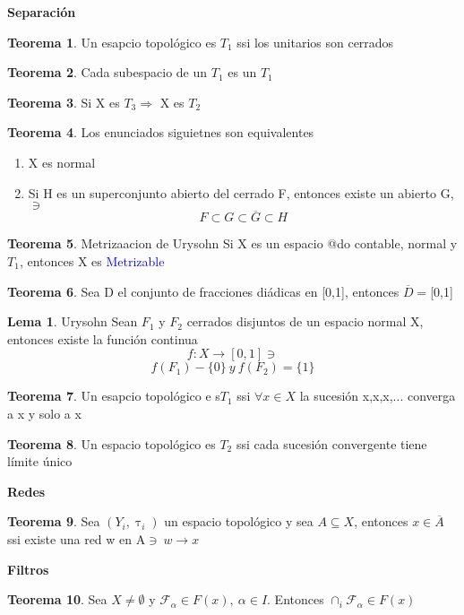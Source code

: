 \documentclass{article}
\theoremstyle{definition}
\newtheorem{theorem}{Teorema}[section]
\newtheorem{lemma}{Lema}[section]
\begin{document}
\textbf{Separación}
\begin{theorem}
	Un esapcio topológico es $T_1$ ssi los unitarios son cerrados
\end{theorem}
\begin{theorem}
	Cada subespacio de un $T_1$ es un $T_1$
\end{theorem}
\begin{theorem}
	Si X es $T_3\Rightarrow$ X es $T_2$
\end{theorem}
\begin{theorem}
	Los enunciados siguietnes son equivalentes
	\begin{enumerate}
		\item X es normal
		\item Si H es un superconjunto abierto del cerrado F, entonces existe un abierto G, $\ni$
		\[F\subset G\subset \overline{G}\subset H\]
	\end{enumerate}
\end{theorem}
\begin{theorem}{Metrizaacion de Urysohn}
	Si X es un espacio @do contable, normal y $T_1$, entonces X es \textcolor{blue}{Metrizable}
\end{theorem}
\begin{theorem}
	Sea D el conjunto de fracciones diádicas en [0,1], entonces $\overline{D}=$[0,1]
\end{theorem}
\begin{lemma}{Urysohn}
	Sean $F_1$ y $F_2$ cerrados disjuntos de un espacio normal X, entonces existe la función continua 
	\[f:X\to[0,1]\ni\]
	\[f(F_1)-\{0\}\ y \ f(F_2)=\{1\}\]
\end{lemma}
\begin{theorem}
	Un esapcio topológico e s$T_1$ ssi $\forall x\in X$ la sucesión x,x,x,... converga a x y solo a x
\end{theorem}
\begin{theorem}
	Un espacio topológico es $T_2$ ssi cada sucesión convergente tiene límite único
\end{theorem}
\textbf{Redes}
\begin{theorem}
	Sea $(Y_i,\uptau_i)$ un espacio topológico y sea $A\subseteq X$, entonces $x\in \overline{A}$ ssi existe una red w en A$\ni\ w\to x$
\end{theorem}
\textbf{Filtros}
\begin{theorem}

	Sea $X\neq\emptyset$ y $\mathcal{F}_{\alpha}\in F(x),\ \alpha\in I$. Entonces $\cap_i\mathcal{F}_{\alpha}\in F(x)$
\end{theorem}
\end{document}
